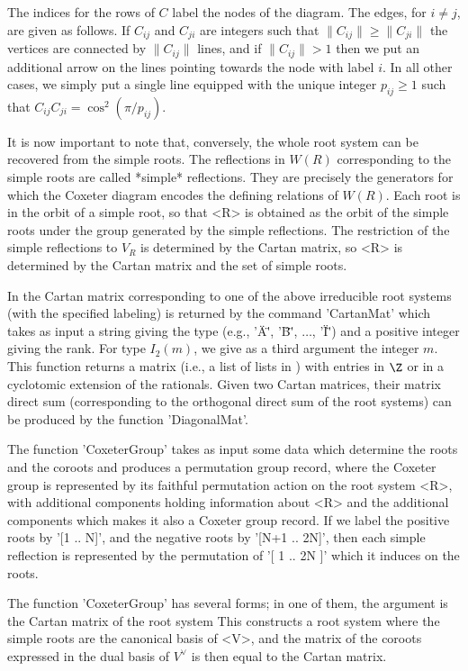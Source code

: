 The  indices for the rows of $C$ label the nodes of the diagram. The edges,
for  $i \ne j$, are given as follows. If $C_{ij}$ and $C_{ji}$ are integers
such  that  $\|C_{ij}\|  \ge  \|C_{ji}\|$  the  vertices  are  connected by
$\|C_{ij}\|$  lines, and if $\|C_{ij}\|>1$ then  we put an additional arrow
on  the lines pointing towards the node with label $i$. In all other cases,
we simply put a single line equipped with the unique integer $p_{ij} \ge 1$
such that $C_{ij}C_{ji}=\cos^2 (\pi/p_{ij})$.

It  is now important to note that, conversely, the whole root system can be
recovered from the simple roots. The reflections in $W(R)$ corresponding to
the  simple roots are  called *simple* reflections.  They are precisely the
generators  for which the Coxeter diagram encodes the defining relations of
$W(R)$. Each root is in the orbit of a simple root, so that <R> is obtained
as  the orbit of the  simple roots under the  group generated by the simple
reflections.  The  restriction  of  the  simple  reflections  to  $V_R$  is
determined  by the Cartan matrix, so <R> is determined by the Cartan matrix
and the set of simple roots.

In  {\GAP} the Cartan matrix corresponding  to one of the above irreducible
root  systems  (with  the  specified  labeling)  is returned by the command
'CartanMat'  which takes as input a  string giving the type (e.g., '\"A\"',
'\"B\"', $\dots$, '\"I\"') and a positive integer giving the rank. For type
$I_2(m)$,  we  give  as  a  third  argument  the integer $m$. This function
returns  a matrix (i.e., a list of lists in {\GAP}) with entries in $\Z$ or
in  a cyclotomic  extension of  the rationals.  Given two  Cartan matrices,
their  matrix direct sum (corresponding to the orthogonal direct sum of the
root systems) can be produced by the function 'DiagonalMat'.

The  function 'CoxeterGroup' takes  as input some  data which determine the
roots and the coroots and produces a {\GAP} permutation group record, where
the  Coxeter group is represented by its faithful permutation action on the
root  system <R>, with additional  components holding information about <R>
and  the additional components which makes  it also a Coxeter group record.
If  we label the  positive roots by  '[1 .. N]',  and the negative roots by
'[N+1  ..  2\*N]',  then  each  simple  reflection  is  represented  by the
permutation of '[ 1 .. 2\*N ]' which it induces on the roots.


The function 'CoxeterGroup' has several forms; in one of them, the argument
is the Cartan matrix of the root system This constructs a root system where
the  simple roots  are the  canonical basis  of <V>,  and the matrix of the
coroots expressed in the dual basis of $V^\vee$ is then equal to the Cartan
matrix.

